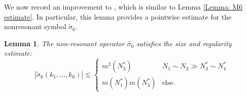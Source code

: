 \documentclass[12pt, letterpaper]{amsart}
\newtheorem{lemma}{Lemma}
\begin{document}
We now record an improvement to \cite[Lemma 5.8]{schippa2024improved}, which is similar to Lemma \ref{Lemma: M6 estimate}. In particular, this lemma provides a pointwise estimate for the nonresonant symbol $\tilde{\sigma}_6$. 
\begin{lemma}\label{Lemma: spatial symbol size estimate}
    The non-resonant operator $\tilde{\sigma_6}$ satisfies the size and regularity estimate:
    \begin{equation}
    \left|\tilde{\sigma}_6(k_1, \dots, k_6)\right|\lesssim 
    \begin{cases}
        m^2(N_3^*) & N_1\sim N_2\gg N_3^*\sim N_4^*\\
        m(N_1^*)m(N_3^*) & \mbox{else}.
    \end{cases}
    \end{equation}
\end{lemma}
\end{document}
